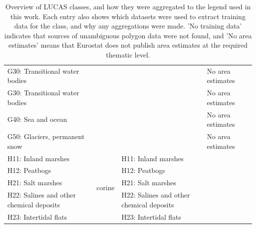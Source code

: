 \begin{table}[]
{\begin{tabular}{llll}
G30: Transitional water bodies                &                         &                                                       & No area estimates                                         \\
G30: Transitional water bodies                &                         &                                                       & No area estimates                                         \\
G40: Sea and ocean                            &                         &                                                       & No area estimates                                         \\
G50: Glaciers, permanent snow                 &                         &                                                       & No area estimates                                         \\
H11: Inland marshes                           & \multirow{5}{*}{corine} & H11: Inland marshes                                   &                                                           \\
H12: Peatbogs                                 &                         & H12: Peatbogs                                         &                                                           \\
H21: Salt marshes                             &                         & H21: Salt marshes                                     &                                                           \\
H22: Salines and other chemical deposits      &                         & H22: Salines and other chemical deposits              &                                                           \\
H23: Intertidal flats                         &                         & H23: Intertidal flats                                 &                                                          
\end{tabular}
}
\caption{Overview of LUCAS classes, and how they were aggregated to the legend used in this work. Each entry also shows which datasets were used to extract training data for the class, and why any aggregations were made. 'No training data' indicates that sources of unambiguous polygon data were not found, and 'No area estimates' means that Eurostat does not publish area estimates at the required thematic level.}
\label{tab:05_legend_harmonization}
\end{table}

